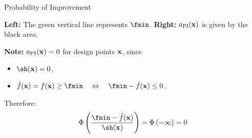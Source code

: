 \documentclass[11pt,compress,t,notes=noshow, xcolor=table]{beamer}
\begin{document}
\begin{frame}{Probability of Improvement}
{\begin{footnotesize}
    \textbf{Left:} The green vertical line represents $\fmin$.
    \textbf{Right:} $a_{\text{PI}}(\mathbf{x})$ is given by the black area.
\end{footnotesize}
}


 {
\vspace{1em}
\textbf{Note:} $a_\text{PI}(\mathbf{x})=0$ for design points $\mathbf{x}$, since
\begin{itemize}
    \item $\sh(\xv) = 0$,
    \item $\fh(\xv) = f(\xv) \ge \fmin \quad \Leftrightarrow \quad \fmin - \fh(\xv) \le 0$.
\end{itemize}
Therefore:
$$
  \Phi\left(\frac{\fmin - \fh(\xv)}{\sh(\xv)}\right) = \Phi\left(- \infty\right) = 0
$$

}

\end{frame}
\end{document}
